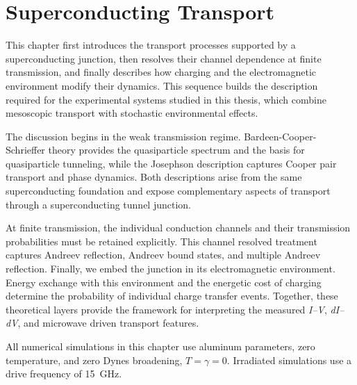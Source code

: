 \chapter{Superconducting Transport}
\label{ch:superconducting-transport}
\thispagestyle{chapterstart}

    This chapter first introduces the transport processes supported by a superconducting junction, then resolves their channel dependence at finite transmission, and finally describes how charging and the electromagnetic environment modify their dynamics. This sequence builds the description required for the experimental systems studied in this thesis, which combine mesoscopic transport with stochastic environmental effects.
    
    The discussion begins in the weak transmission regime. Bardeen-Cooper-Schrieffer theory provides the quasiparticle spectrum and the basis for quasiparticle tunneling, while the Josephson description captures Cooper pair transport and phase dynamics. Both descriptions arise from the same superconducting foundation and expose complementary aspects of transport through a superconducting tunnel junction.

    At finite transmission, the individual conduction channels and their transmission probabilities must be retained explicitly. This channel resolved treatment captures Andreev reflection, Andreev bound states, and multiple Andreev reflection. Finally, we embed the junction in its electromagnetic environment. Energy exchange with this environment and the energetic cost of charging determine the probability of individual charge transfer events. Together, these theoretical layers provide the framework for interpreting the measured \textit{I--V}, \textit{dI--dV}, and microwave driven transport features.

    All numerical simulations in this chapter use aluminum parameters, zero temperature, and zero Dynes broadening, $T=\gamma=0$. Irradiated simulations use a drive frequency of \qty{15}{\giga\hertz}.
